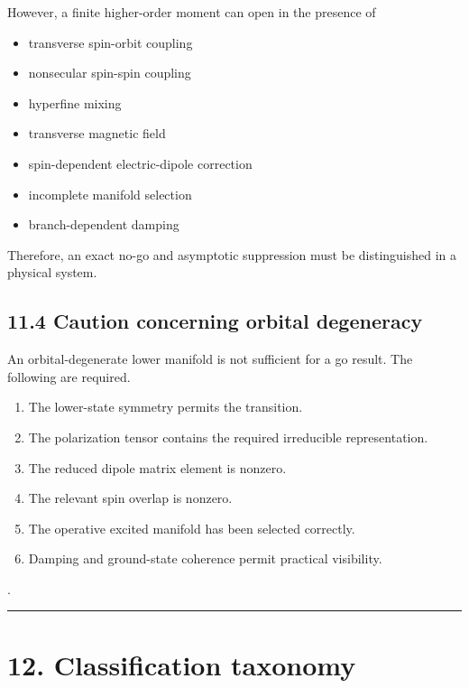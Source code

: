 \documentclass[
  10pt,
  a4paper,
]{article}
\providecommand{\tightlist}{%
  \setlength{\itemsep}{0pt}\setlength{\parskip}{0pt}}
\begin{document}
However, a finite higher-order moment can open in the presence of

\begin{itemize}
\tightlist
\item
  transverse spin-orbit coupling
\item
  nonsecular spin-spin coupling
\item
  hyperfine mixing
\item
  transverse magnetic field
\item
  spin-dependent electric-dipole correction
\item
  incomplete manifold selection
\item
  branch-dependent damping
\end{itemize}

Therefore, an exact no-go and asymptotic suppression must be
distinguished in a physical system.

\subsection{11.4 Caution concerning orbital
degeneracy}\label{caution-concerning-orbital-degeneracy}

An orbital-degenerate lower manifold is not sufficient for a go result.
The following are required.

\begin{enumerate}
\def\labelenumi{\arabic{enumi}.}
\tightlist
\item
  The lower-state symmetry permits the transition.
\item
  The polarization tensor contains the required irreducible
  representation.
\item
  The reduced dipole matrix element is nonzero.
\item
  The relevant spin overlap is nonzero.
\item
  The operative excited manifold has been selected correctly.
\item
  Damping and ground-state coherence permit practical visibility.
\end{enumerate}

.

\begin{center}\rule{0.5\linewidth}{0.5pt}\end{center}

\section{12. Classification taxonomy}\label{classification-taxonomy}
\end{document}

